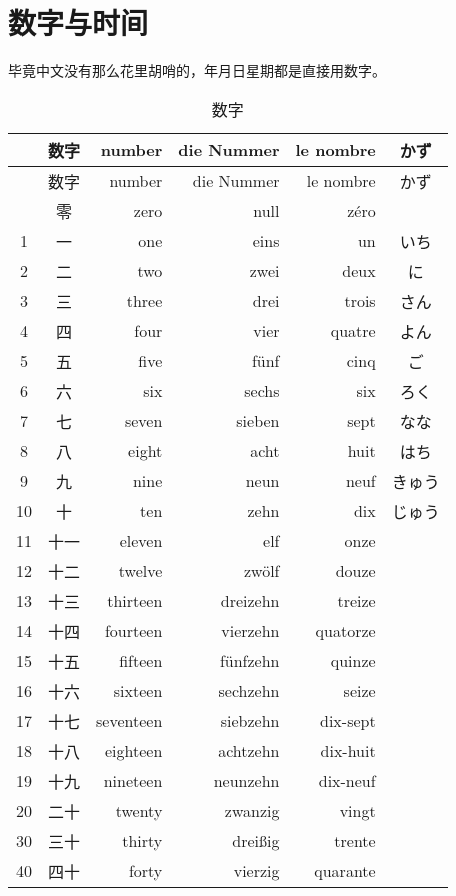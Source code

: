 \documentclass[12pt,A4paper,oneside,reqno]{amsart}
\numberwithin{equation}{section}
\theoremstyle{plain}
\theoremstyle{plain}
\theoremstyle{plain}
\numberwithin{equation}{section}
\theoremstyle{remark}
\begin{document}
\section{数字与时间}
毕竟中文没有那么花里胡哨的，年月日星期都是直接用数字。

\begin{longtable}{c|c|r|r|r|c}
	\hline
	&	数字	&	number	&	die Nummer	&	le nombre	&	かず	\\						
	\hline
	\endhead
	\hline
	&	数字	&	number	&	die Nummer	&	le nombre	&	かず	\\							
	\hline
	\endfirsthead	
	\hline
	\endfoot
	\hline
	\caption{数字}
	\endlastfoot											
\hline											
0	&	零	&	zero	&	null	&	zéro	&		\\
1	&	一	&	one	&	eins	&	un	&	いち	\\
2	&	二	&	two	&	zwei	&	deux	&	に	\\
3	&	三	&	three	&	drei	&	trois	&	さん	\\
4	&	四	&	four	&	vier	&	quatre	&	よん	\\
5	&	五	&	five	&	fünf	&	cinq	&	ご	\\
6	&	六	&	six	&	sechs	&	six	&	ろく	\\
7	&	七	&	seven	&	sieben	&	sept	&	なな	\\
8	&	八	&	eight	&	acht	&	huit	&	はち	\\
9	&	九	&	nine	&	neun	&	neuf	&	きゅう	\\
10	&	十	&	ten	&	zehn	&	dix	&	じゅう	\\
11	&	十一	&	eleven	&	elf	&	onze	&		\\
12	&	十二	&	twelve	&	zwölf	&	douze	&		\\
13	&	十三	&	thirteen	&	dreizehn	&	treize	&		\\
14	&	十四	&	fourteen	&	vierzehn	&	quatorze	&		\\
15	&	十五	&	fifteen	&	fünfzehn	&	quinze	&		\\
16	&	十六	&	sixteen	&	sechzehn	&	seize	&		\\
17	&	十七	&	seventeen	&	siebzehn	&	dix-sept	&		\\
18	&	十八	&	eighteen	&	achtzehn	&	dix-huit	&		\\
19	&	十九	&	nineteen	&	neunzehn	&	dix-neuf	&		\\
20	&	二十	&	twenty	&	zwanzig	&	vingt	&		\\
30	&	三十	&	thirty	&	drei\ss ig	&	trente	&		\\
40	&	四十	&	forty	&	vierzig	&	quarante	&		\\

\end{longtable}
\end{document}

